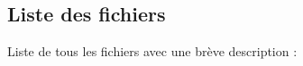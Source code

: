 \subsection{Liste des fichiers}
Liste de tous les fichiers avec une brève description \+:\begin{DoxyCompactList}
\item{}
\end{DoxyCompactList}

